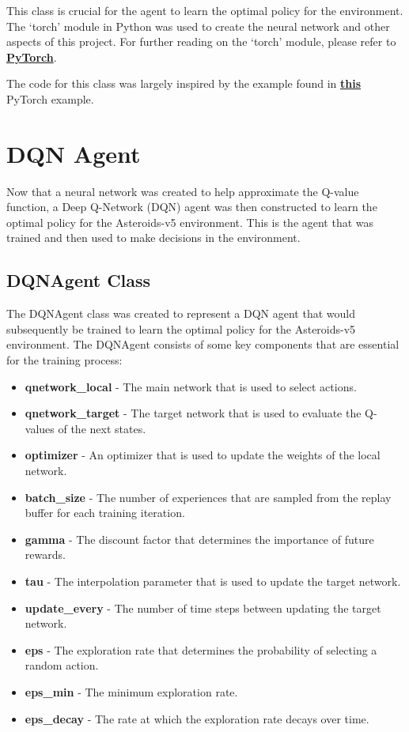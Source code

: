 \documentclass[
	a4paper, %
	10pt, %
	unnumberedsections, %
	twoside, %
]{LTJournalArticle}
\begin{document}
This class is crucial for the agent to learn the optimal policy for the environment. The `torch' module in Python was used to create the neural network and other aspects of this project. For further 
reading on the `torch' module, please refer to \href{https://pypi.org/project/torch/}{\textbf{PyTorch}}.

The code for this class was largely inspired by the example found in \href{https://pytorch.org/tutorials/intermediate/reinforcement_q_learning.html}{\textbf{this}} PyTorch example.

\section{DQN Agent}

Now that a neural network was created to help approximate the Q-value function, a Deep Q-Network (DQN) agent was then constructed to learn the optimal policy for the Asteroids-v5 environment. This is 
the agent that was trained and then used to make decisions in the environment.

\subsection{DQNAgent Class}

The DQNAgent class was created to represent a DQN agent that would subsequently be trained to learn the optimal policy for the Asteroids-v5 environment. The DQNAgent consists of some key components
that are essential for the training process:

\begin{itemize}
	\item \textbf{qnetwork\_local} - The main network that is used to select actions.
	\item \textbf{qnetwork\_target} - The target network that is used to evaluate the Q-values of the next states.
	\item \textbf{optimizer} - An optimizer that is used to update the weights of the local network.
	\item \textbf{batch\_size} - The number of experiences that are sampled from the replay buffer for each training iteration.
	\item \textbf{gamma} - The discount factor that determines the importance of future rewards.
	\item \textbf{tau} - The interpolation parameter that is used to update the target network.
	\item \textbf{update\_every} - The number of time steps between updating the target network.
	\item \textbf{eps} - The exploration rate that determines the probability of selecting a random action.
	\item \textbf{eps\_min} - The minimum exploration rate.
	\item \textbf{eps\_decay} - The rate at which the exploration rate decays over time.
\end{itemize}
\end{document}
